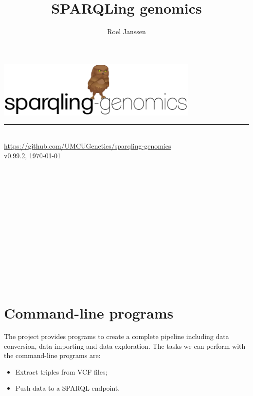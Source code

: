 \documentclass[11pt,a4paper,oneside]{book}
\title{SPARQLing genomics}
\author{Roel Janssen}
\begin{document}
\begin{titlepage}
  \vspace*{\fill}
  \begin{center}
    \includegraphics[width=0.75\textwidth]{figures/logo.pdf}
    \rule{0.75\textwidth}{1.0pt}~\\
    \url{https://github.com/UMCUGenetics/sparqling-genomics}~\\
    \large v0.99.2, \today{}
    ~\\~\\~\\~\\~\\~\\~\\~\\~\\~\\~\\~\\~\\~\\
  \end{center}
  \vspace*{\fill}

  \thispagestyle{empty}
\end{titlepage}

\setcounter{page}{1}
\hypersetup{linkcolor=black}
\tableofcontents
\newpage{}
\hypersetup{linkcolor=LinkGray}
\setcounter{page}{1}



\chapter{Command-line programs}

  The project provides programs to create a complete pipeline including
  data conversion, data importing and data exploration.  The tasks we can
  perform with the command-line programs are:
  \begin{itemize}
    \item Extract triples from VCF files;
    \item Push data to a SPARQL endpoint.
  \end{itemize}
\end{document}
